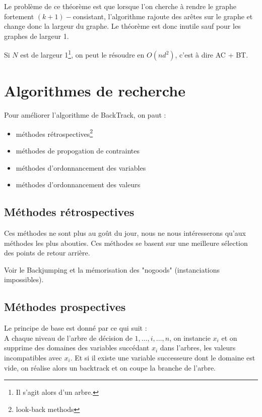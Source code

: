 Le problème de ce théorème est que lorsque l'on cherche à rendre le graphe fortement
$(k+1)-$consistant, l'algorithme rajoute des arêtes sur le graphe et change donc la largeur du
graphe. Le théorème est donc inutile sauf pour les graphes de largeur 1.

\begin{corol}
    Si $N$ est de largeur 1\footnote{Il s'agit alors d'un arbre.}, on peut le résoudre en $O(nd^2)$,
    c'est à dire AC + BT.
\end{corol}

\section{Algorithmes de recherche}

Pour améliorer l'algorithme de BackTrack, on paut :
\begin{itemize}
    \item méthodes rétrospectives\footnote{look-back methods}
    \item méthodes de propogation de contraintes
    \item méthodes d'ordonnancement des variables
    \item méthodes d'ordonnancement des valeurs
\end{itemize}

\subsection{Méthodes rétrospectives}

Ces méthodes ne sont plus au goût du jour, nous ne nous intéresserons qu'aux méthodes les plus
abouties. Ces méthodes se basent sur une meilleure sélection des points de retour arrière.

Voir le Backjumping et la mémorisation des "nogoods" (instanciations impossibles).

\subsection{Méthodes prospectives}

Le principe de base est donné par ce qui suit :\\
A chaque niveau de l'arbre de décision de $1, \dots, i, \dots, n$, on instancie $x_i$ et on supprime
des domaines des variables succédant $x_i$ dans l'arbres, les valeurs incompatibles avec $x_i$. Et
si il existe une variable successeure dont le domaine est vide, on réalise alors un backtrack et on
coupe la branche de l'arbre.

